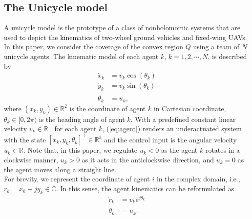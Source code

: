 \documentclass[journal]{IEEEtran}
\begin{document}
	
	
	
	
	\subsection{The Unicycle model}
	
	A unicycle model is the prototype of a class of nonholomomic systems that are used to depict the kinematics of two-wheel ground vehicles and fixed-wing UAVs. In this paper, we consider the coverage of the convex region $Q$ using a team of $N$ unicycle agents. The kinematic model of each agent $k$, $k = 1,2,\cdots, N$, is described by
	\begin{equation}\label{eq:agent}
	\begin{split}
	\dot{x}_k &= v_k \cos(\theta_k) \\
	\dot{y}_k &= v_k \sin(\theta_k) \\
	\dot{\theta}_k &= u_k,
	\end{split}
	\end{equation}
	where $(x_k, y_k) \in \mathbb{R}^2$ is the coordinate of agent $k$ in Cartesian coordinate, $\theta_k \in [0, 2\pi)$ is the heading angle of agent $k$. With a predefined constant linear velocity $v_k \in \mathbb{R}^+$ for each agent $k$, (\ref{eq:agent}) renders an underactuated system with the state $[x_k, y_k, \theta_k]^{\top} \in \mathbb{R}^3$ and the control input is the angular velocity $u_k \in \mathbb{R}$. Note that, in this paper, we regulate $u_k <0$ as the agent $k$ rotates in a clockwise manner, $u_k>0$ as it acts in the anticlockwise direction, and $u_k = 0$ as the agent moves along a straight line. \\
	
	For brevity, we represent the coordinate of agent $i$ in the complex domain, i.e., $r_k = x_k + j y_k \in \mathbb{C}$. In this sense, the agent kinematics can be reformulated as
	\begin{equation}
	\begin{split}
	\dot{r}_k &= v_k e^{j \theta_k} \\
	\dot{\theta}_k &= u_k.
	\end{split}
	\end{equation}
	
\end{document}
